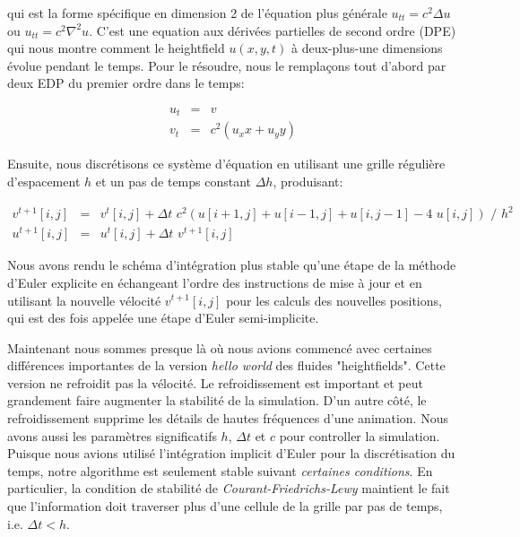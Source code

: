 \documentclass[11pt]{report}
\begin{document}
qui est la forme spécifique en dimension 2 de l'équation plus générale $u_{tt} = c^2 \Delta u$ ou $u_{tt} = c^2 \nabla^2 u$. C'est une equation aux dérivées partielles de second ordre (DPE) qui nous montre comment le heightfield $u(x,y,t)$ à deux-plus-une dimensions évolue pendant le temps. Pour le résoudre, nous le remplaçons tout d'abord par deux EDP du premier ordre dans le temps:

\begin{eqnarray}
u_t & = & v\\
v_t & = & c^2(u_xx+u_yy)
\end{eqnarray}

Ensuite, nous discrétisons ce système d'équation en utilisant une grille régulière d'espacement $h$ et un pas de temps constant $\Delta h$, produisant:

\begin{eqnarray}
v^{t+1}[i,j] &=& v^{t}[i,j] + \Delta t\,\,c^2 (u[i+1,j] + u[i-1,j] + u[i,j-1] - 4\,\,u[i,j])\,\,/\,\,h^2\\
u^{t+1}[i,j] &=& u^t[i,j] + \Delta t \,\,v^{t+1}[i,j]
\end{eqnarray}

Nous avons rendu le schéma d'intégration plus stable qu'une étape de la méthode d'Euler explicite en échangeant l'ordre des instructions de mise à jour et en utilisant la nouvelle vélocité $v^{t+1}[i,j]$ pour les calculs des nouvelles positions, qui est des fois appelée une étape d'Euler semi-implicite.\newline

Maintenant nous sommes presque là où nous avions commencé avec certaines différences importantes de la version \textit{hello world} des fluides "heightfields". Cette version ne refroidit pas la vélocité. Le refroidissement est important et peut grandement faire augmenter la stabilité de la simulation. D'un autre côté, le refroidissement supprime les détails de hautes fréquences d'une animation. Nous avons aussi les paramètres significatifs $h$, $\Delta t$ et $c$ pour controller la simulation. Puisque nous avions utilisé l'intégration implicit d'Euler pour la discrétisation du temps, notre algorithme est seulement stable suivant \textit{certaines conditions}. En particulier, la condition de stabilité de \textit{Courant-Friedrichs-Lewy} maintient le fait que l'information doit traverser plus d'une cellule de la grille par pas de temps, i.e. $\Delta t < h$.\newline
\end{document}
